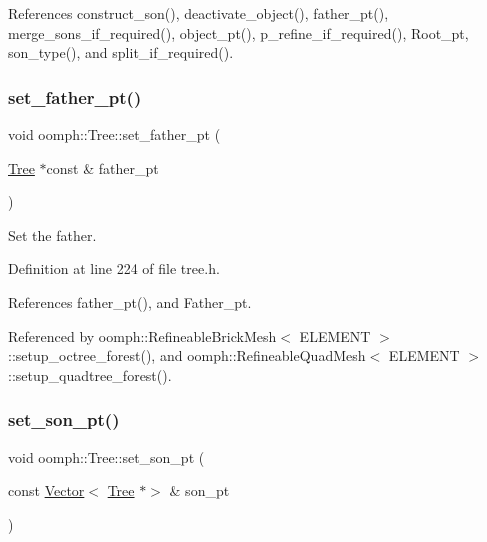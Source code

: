 References construct\+\_\+son(), deactivate\+\_\+object(), father\+\_\+pt(), merge\+\_\+sons\+\_\+if\+\_\+required(), object\+\_\+pt(), p\+\_\+refine\+\_\+if\+\_\+required(), Root\+\_\+pt, son\+\_\+type(), and split\+\_\+if\+\_\+required().

\mbox{\label{classoomph_1_1Tree_ac0cf27d3116db0f8d2f18b3faf09ec15}} 
\subsubsection{\texorpdfstring{set\+\_\+father\+\_\+pt()}{set\_father\_pt()}}
{\footnotesize\ttfamily void oomph\+::\+Tree\+::set\+\_\+father\+\_\+pt (\begin{DoxyParamCaption}\item[{\hyperlink{classoomph_1_1Tree}{Tree} $\ast$const \&}]{father\+\_\+pt }\end{DoxyParamCaption})\hspace{0.3cm}{\ttfamily [inline]}}



Set the father. 



Definition at line 224 of file tree.\+h.



References father\+\_\+pt(), and Father\+\_\+pt.



Referenced by oomph\+::\+Refineable\+Brick\+Mesh$<$ E\+L\+E\+M\+E\+N\+T $>$\+::setup\+\_\+octree\+\_\+forest(), and oomph\+::\+Refineable\+Quad\+Mesh$<$ E\+L\+E\+M\+E\+N\+T $>$\+::setup\+\_\+quadtree\+\_\+forest().

\mbox{\label{classoomph_1_1Tree_a0e3a4700ea3023be0f38427286abba56}} 
\subsubsection{\texorpdfstring{set\+\_\+son\+\_\+pt()}{set\_son\_pt()}}
{\footnotesize\ttfamily void oomph\+::\+Tree\+::set\+\_\+son\+\_\+pt (\begin{DoxyParamCaption}\item[{const \hyperlink{classoomph_1_1Vector}{Vector}$<$ \hyperlink{classoomph_1_1Tree}{Tree} $\ast$$>$ \&}]{son\+\_\+pt }\end{DoxyParamCaption})\hspace{0.3cm}{\ttfamily [inline]}}



